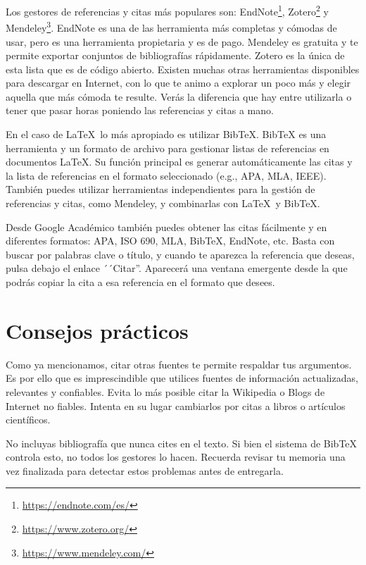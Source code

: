 Los gestores de referencias y citas más populares son: EndNote\footnote{\url{https://endnote.com/es/}}, Zotero\footnote{\url{https://www.zotero.org/}} y Mendeley\footnote{\url{https://www.mendeley.com/}}. EndNote es una de las herramienta más completas y cómodas de usar, pero es una herramienta propietaria y es de pago. Mendeley es gratuita y te permite exportar conjuntos de bibliografías rápidamente. Zotero es la única de esta lista que es de código abierto. Existen muchas otras herramientas disponibles para descargar en Internet, con lo que te animo a explorar un poco más y elegir aquella que más cómoda te resulte. Verás la diferencia que hay entre utilizarla o tener que pasar horas poniendo las referencias y citas a mano.

En el caso de \LaTeX\ lo más apropiado es utilizar BibTeX. BibTeX es una herramienta y un formato de archivo para gestionar listas de referencias en documentos \LaTeX. Su función principal es generar automáticamente las citas y la lista de referencias en el formato seleccionado (e.g., APA, MLA, IEEE). También puedes utilizar herramientas independientes para la gestión de referencias y citas, como Mendeley, y combinarlas con \LaTeX\ y BibTeX.

Desde Google Académico también puedes obtener las citas fácilmente y en diferentes formatos: APA, ISO 690, MLA, BibTeX, EndNote, etc. Basta con buscar por palabras clave o título, y cuando te aparezca la referencia que deseas, pulsa debajo el enlace ´´Citar''. Aparecerá una ventana emergente desde la que podrás copiar la cita a esa referencia en el formato que desees.

\section{Consejos prácticos}

Como ya mencionamos, citar otras fuentes te permite respaldar tus argumentos. Es por ello que es imprescindible que utilices fuentes de información actualizadas, relevantes y confiables. Evita lo más posible citar la Wikipedia o Blogs de Internet no fiables. Intenta en su lugar cambiarlos por citas a libros o artículos científicos.


No incluyas bibliografía que nunca cites en el texto. Si bien el sistema de BibTeX controla esto, no todos los gestores lo hacen. Recuerda revisar tu memoria una vez finalizada para detectar estos problemas antes de entregarla.

